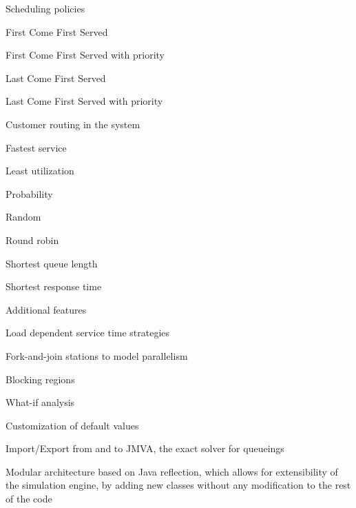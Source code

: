 \noindent Scheduling policies 
\begin{itemize*}
	\item First Come First Served
	\item First Come First Served with priority
	\item Last Come First Served
	\item Last Come First Served with priority
\end{itemize*}

\noindent Customer routing in the system
\begin{itemize*}
	\item Fastest service
	\item Least utilization
	\item Probability
	\item Random
	\item Round robin
	\item Shortest queue length
	\item Shortest response time 
\end{itemize*}

\noindent Additional features
\begin{itemize*}
	\item Load dependent service time strategies
	\item Fork-and-join stations to model parallelism
	\item Blocking regions
	\item What-if analysis 
	\item Customization of default values
	\item Import/Export from and to JMVA, the exact solver for queueings
	\item Modular architecture based on Java reflection, which allows for extensibility of the simulation engine, by adding new classes without any modification to the rest of the code
\end{itemize*}

